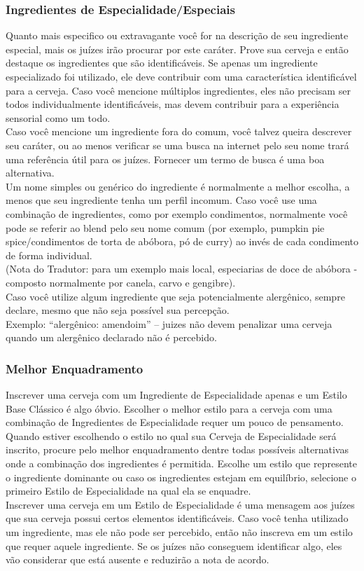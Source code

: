 \subsubsection*{Ingredientes de Especialidade/Especiais}
Quanto mais especifico ou extravagante você for na descrição de seu ingrediente especial, mais os juízes irão procurar por este caráter. Prove sua cerveja e então destaque os ingredientes que são identificáveis. Se apenas um ingrediente especializado foi utilizado, ele deve contribuir com uma característica identificável para a cerveja. Caso você mencione múltiplos ingredientes, eles não precisam ser todos individualmente identificáveis, mas devem contribuir para a experiência sensorial como um todo.\\
Caso você mencione um ingrediente fora do comum, você talvez queira descrever seu caráter, ou ao menos verificar se uma busca na internet pelo seu nome trará uma referência útil para os juízes. Fornecer um termo de busca é uma boa alternativa.\\
Um nome simples ou genérico do ingrediente é normalmente a melhor escolha, a menos que seu ingrediente tenha um perfil incomum. Caso você use uma combinação de ingredientes, como por exemplo condimentos, normalmente você pode se referir ao blend pelo seu nome comum (por exemplo, pumpkin pie spice/condimentos de torta de abóbora, pó de curry) ao invés de cada condimento de forma individual.\\
(Nota do Tradutor: para um exemplo mais local, especiarias de doce de abóbora - composto normalmente por canela, carvo e gengibre).\\
Caso você utilize algum ingrediente que seja potencialmente alergênico, sempre declare, mesmo que não seja possível sua percepção.\\
Exemplo: “alergênico: amendoim” – juizes não devem penalizar uma cerveja quando um alergênico declarado não é percebido.

\subsubsection*{Melhor Enquadramento}
Inscrever uma cerveja com um Ingrediente de Especialidade apenas e um Estilo Base Clássico é algo óbvio. Escolher o melhor estilo para a cerveja com uma combinação de Ingredientes de Especialidade requer um pouco de pensamento. Quando estiver escolhendo o estilo no qual sua Cerveja de Especialidade será inscrito, procure pelo melhor enquadramento dentre todas possíveis alternativas onde a combinação dos ingredientes é permitida. Escolhe um estilo que represente o ingrediente dominante ou caso os ingredientes estejam em equilíbrio, selecione o primeiro Estilo de Especialidade na qual ela se enquadre.\\
Inscrever uma cerveja em um Estilo de Especialidade é uma mensagem aos juízes que sua cerveja possui certos elementos identificáveis. Caso você tenha utilizado um ingrediente, mas ele não pode ser percebido, então não inscreva em um estilo que requer aquele ingrediente. Se os juízes não conseguem identificar algo, eles vão considerar que está ausente e reduzirão a nota de acordo.